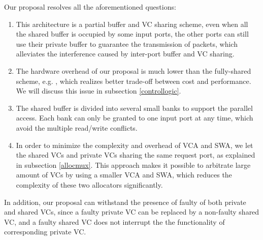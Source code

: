 \documentclass[10pt,conference]{IEEEtran}
\begin{document}
Our proposal resolves all the aforementioned questions:
\begin{enumerate}
\item This architecture is a partial buffer and VC sharing scheme, even when all the shared buffer is occupied by some input ports, the other ports can still use their private buffer to guarantee the transmission of packets, which alleviates the interference caused by inter-port buffer and VC sharing.
\item The hardware overhead of our proposal is much lower than the fully-shared scheme, e.g. \cite{Neishaburi:2009:RAN:1531542.1531658}\cite{5770788}, which realizes better trade-off between cost and performance. We will discuss this issue in subsection \ref{controllogic}.
\item The shared buffer is divided into several small banks to support the parallel access. Each bank can only be granted to one input port at any time, which avoid the multiple read/write conflicts.
\item In order to minimize the complexity and overhead of VCA and SWA, we let the shared VCs and private VCs sharing the same request port, as explained in subsection \ref{allocmux}. This approach makes it possible to arbitrate large amount of VCs by using a smaller VCA and SWA, which reduces the complexity of these two allocators significantly.
\end{enumerate}

In addition, our proposal can withstand the presence of faulty of both private and shared VCs, since a faulty private VC can be replaced by a non-faulty shared VC, and a faulty shared VC does not interrupt the the functionality of corresponding private VC.

\end{document}
